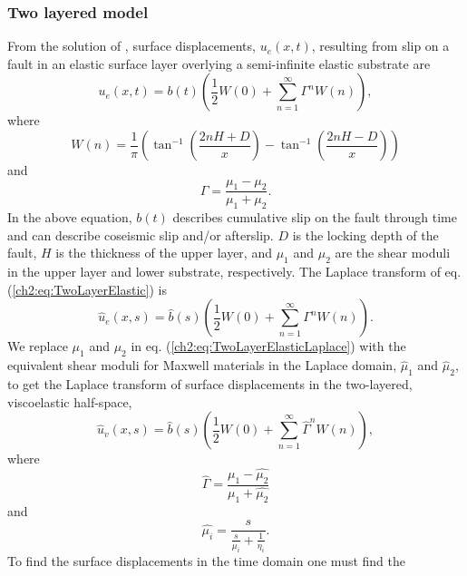 \subsubsection{Two layered model}\label{ch2:sec:2D2LModel}
From the solution of \citet{Rybicki1971}, surface displacements,
$u_{e}(x,t)$, resulting from slip on a fault in an elastic surface
layer overlying a semi-infinite elastic substrate are
\begin{equation}\label{ch2:eq:TwoLayerElastic}
u_{e}(x,t) = 
b(t)\left(\frac{1}{2} W(0) + 
\sum_{n=1}^\infty \Gamma^nW(n)\right),
\end{equation}
where
\begin{equation}
W(n) = 
\frac{1}{\pi}\left(\tan^{-1}\left(\frac{2nH + D}{x}\right) - 
\tan^{-1}\left(\frac{2nH - D}{x}\right)\right)
\end{equation}
and
\begin{equation}
\Gamma = \frac{\mu_1 - \mu_2}{\mu_1 + \mu_2}.
\end{equation}
In the above equation, $b(t)$ describes cumulative slip on the fault
through time and can describe coseismic slip and/or afterslip. $D$ is
the locking depth of the fault, $H$ is the thickness of the upper
layer, and $\mu_1$ and $\mu_2$ are the shear moduli in the upper
layer and lower substrate, respectively.  The Laplace transform of
eq. (\ref{ch2:eq:TwoLayerElastic}) is
\begin{equation}\label{ch2:eq:TwoLayerElasticLaplace}
\hat{u}_e(x,s) = 
\hat{b}(s)\left(\frac{1}{2} W(0) + 
\sum_{n=1}^\infty\Gamma^nW(n)\right).
\end{equation}
We replace $\mu_1$ and $\mu_2$ in eq. (\ref{ch2:eq:TwoLayerElasticLaplace})
with the equivalent shear moduli for Maxwell materials in the Laplace
domain, $\hat{\mu}_1$ and $\hat{\mu}_2$, to get the Laplace
transform of surface displacements in the two-layered, viscoelastic
half-space,
\begin{equation}\label{ch2:eq:TwoLayerViscousLaplace}
\hat{u}_v(x,s) = 
\hat{b}(s)\left(\frac{1}{2}W(0) + 
\sum_{n=1}^\infty\hat{\Gamma}^nW(n)\right),
\end{equation}
where
\begin{equation}
\hat{\Gamma} = 
\frac{\hat{\mu_1} - \hat{\mu_2}}{\hat{\mu_1} + \hat{\mu_2}}
\end{equation}
and
\begin{equation}
\hat{\mu_i} = \frac{s}{\frac{s}{\mu_i} + \frac{1}{\eta_i}}.
\end{equation}
To find the surface displacements in the time domain one must find the
